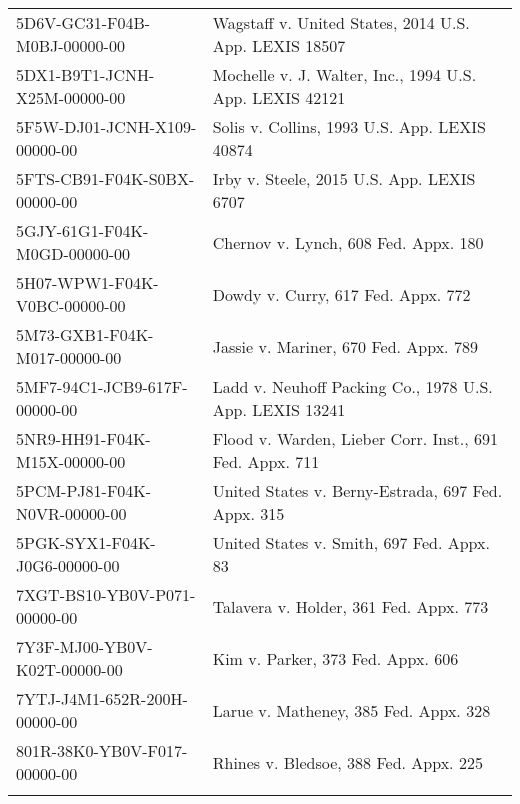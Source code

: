 \documentclass[10pt, letterpaper]{article}
\begin{document}
\begin{spacing}{1.0}
\begin{longtable}{p{2.5in}p{4in}}
    5D6V-GC31-F04B-M0BJ-00000-00 & Wagstaff v. United States, 2014 U.S. App. LEXIS 18507\\
    5DX1-B9T1-JCNH-X25M-00000-00 & Mochelle v. J. Walter, Inc., 1994 U.S. App. LEXIS 42121\\
    5F5W-DJ01-JCNH-X109-00000-00 & Solis v. Collins, 1993 U.S. App. LEXIS 40874\\
    5FTS-CB91-F04K-S0BX-00000-00 & Irby v. Steele, 2015 U.S. App. LEXIS 6707\\
    5GJY-61G1-F04K-M0GD-00000-00 & Chernov v. Lynch, 608 Fed. Appx. 180\\
    5H07-WPW1-F04K-V0BC-00000-00 & Dowdy v. Curry, 617 Fed. Appx. 772\\
    5M73-GXB1-F04K-M017-00000-00 & Jassie v. Mariner, 670 Fed. Appx. 789\\
    5MF7-94C1-JCB9-617F-00000-00 & Ladd v. Neuhoff Packing Co., 1978 U.S. App. LEXIS 13241\\
    5NR9-HH91-F04K-M15X-00000-00 & Flood v. Warden, Lieber Corr. Inst., 691 Fed. Appx. 711\\
    5PCM-PJ81-F04K-N0VR-00000-00 & United States v. Berny-Estrada, 697 Fed. Appx. 315\\
    5PGK-SYX1-F04K-J0G6-00000-00 & United States v. Smith, 697 Fed. Appx. 83\\
    7XGT-BS10-YB0V-P071-00000-00 & Talavera v. Holder, 361 Fed. Appx. 773\\
    7Y3F-MJ00-YB0V-K02T-00000-00 & Kim v. Parker, 373 Fed. Appx. 606\\
    7YTJ-J4M1-652R-200H-00000-00 & Larue v. Matheney, 385 Fed. Appx. 328\\
    801R-38K0-YB0V-F017-00000-00 & Rhines v. Bledsoe, 388 Fed. Appx. 225\\[4pt]
    \hline
    \label{tb:MissingTopicSample}
\end{longtable}    

\normalsize

\end{spacing}
\end{document}
